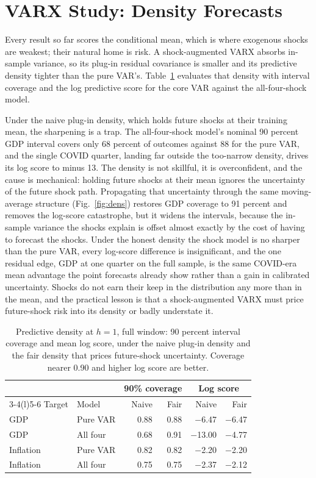 \documentclass[conference]{IEEEtran}
\begin{document}
\section{VARX Study: Density Forecasts}
Every result so far scores the conditional mean, which is where exogenous shocks are weakest; their natural home is risk. A shock-augmented VARX absorbs in-sample variance, so its plug-in residual covariance is smaller and its predictive density tighter than the pure VAR's. Table~\ref{tab:dens} evaluates that density with interval coverage and the log predictive score for the core VAR against the all-four-shock model.

Under the naive plug-in density, which holds future shocks at their training mean, the sharpening is a trap. The all-four-shock model's nominal 90 percent GDP interval covers only 68 percent of outcomes against 88 for the pure VAR, and the single COVID quarter, landing far outside the too-narrow density, drives its log score to minus 13. The density is not skillful, it is overconfident, and the cause is mechanical: holding future shocks at their mean ignores the uncertainty of the future shock path. Propagating that uncertainty through the same moving-average structure (Fig.~\ref{fig:dens}) restores GDP coverage to 91 percent and removes the log-score catastrophe, but it widens the intervals, because the in-sample variance the shocks explain is offset almost exactly by the cost of having to forecast the shocks. Under the honest density the shock model is no sharper than the pure VAR, every log-score difference is insignificant, and the one residual edge, GDP at one quarter on the full sample, is the same COVID-era mean advantage the point forecasts already show rather than a gain in calibrated uncertainty. Shocks do not earn their keep in the distribution any more than in the mean, and the practical lesson is that a shock-augmented VARX must price future-shock risk into its density or badly understate it.

\begin{table}[t]
\caption{Predictive density at $h=1$, full window: 90 percent interval coverage and mean log score, under the naive plug-in density and the fair density that prices future-shock uncertainty. Coverage nearer 0.90 and higher log score are better.}
\label{tab:dens}
\centering
\small
\setlength{\tabcolsep}{4pt}
\begin{tabular}{@{}llrrrr@{}}
\toprule
& & \multicolumn{2}{c}{90\% coverage} & \multicolumn{2}{c}{Log score} \\
\cmidrule(l){3-4}\cmidrule(l){5-6}
Target & Model & Naive & Fair & Naive & Fair \\
\midrule
GDP & Pure VAR & 0.88 & 0.88 & $-$6.47 & $-$6.47 \\
GDP & All four & 0.68 & 0.91 & $-$13.00 & $-$4.77 \\
Inflation & Pure VAR & 0.82 & 0.82 & $-$2.20 & $-$2.20 \\
Inflation & All four & 0.75 & 0.75 & $-$2.37 & $-$2.12 \\
\bottomrule
\end{tabular}
\end{table}
\end{document}
